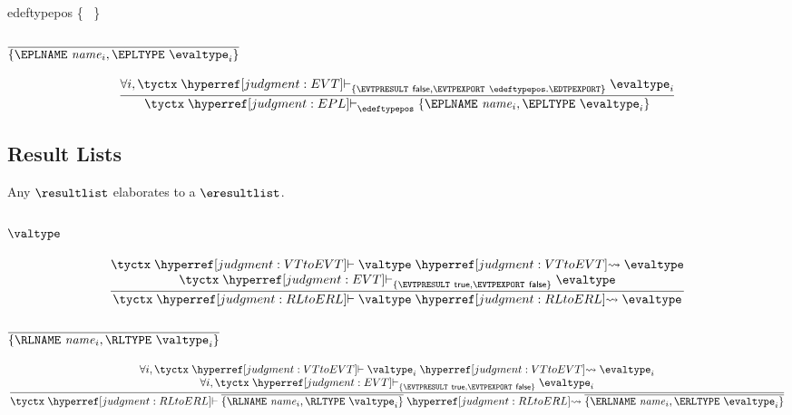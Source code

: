 \begin{record-production}{edeftypepos}
  \{ \EDTPEXPORT~\bool \}
\end{record-production}

\subsubsection{$\overline{\{\EPLNAME~\name_i, \EPLTYPE~\evaltype_i\}}$}
\[
  \frac{
    \forall i, \tyctx \vdashh!EVT!_{\{\EVTPRESULT~\false,\EVTPEXPORT~\edeftypepos.\EDTPEXPORT\}} \evaltype_i
  }{
    \tyctx \vdashh!EPL!_\edeftypepos \{\EPLNAME~\name_i, \EPLTYPE~\evaltype_i\}
  }
\]

\subsection{Result Lists}
\label{judgment:RLtoERL}

Any $\resultlist$ elaborates to a $\eresultlist$.

\subsubsection{$\valtype$}
\[
  \frac{
    \begin{array}{@{}c@{}}
    \tyctx \vdashh!VTtoEVT! \valtype \leadstoh!VTtoEVT! \evaltype\\
    \tyctx \vdashh!EVT!_{\{\EVTPRESULT~\true,\EVTPEXPORT~\false\}} \evaltype\\
    \end{array}
  }{
    \tyctx \vdashh!RLtoERL! \valtype \leadstoh!RLtoERL! \evaltype
  }
\]

\subsubsection{$\overline{\{\RLNAME~\name_i, \RLTYPE~\valtype_i\}}$}
\[
  \frac{
    \begin{array}{@{}c@{}}
    \forall i, \tyctx \vdashh!VTtoEVT! \valtype_i \leadstoh!VTtoEVT! {\evaltype}_i\\
    \forall i, \tyctx \vdashh!EVT!_{\{\EVTPRESULT~\true,\EVTPEXPORT~\false\}} {\evaltype}_i\\
    \end{array}
  }{
    \tyctx \vdashh!RLtoERL! \overline{\{\RLNAME~\name_i,
    \RLTYPE~\valtype_i\}} \leadstoh!RLtoERL! \overline{\{\ERLNAME~\name_i,
    \ERLTYPE~{\evaltype}_i\}}
  }
\]

